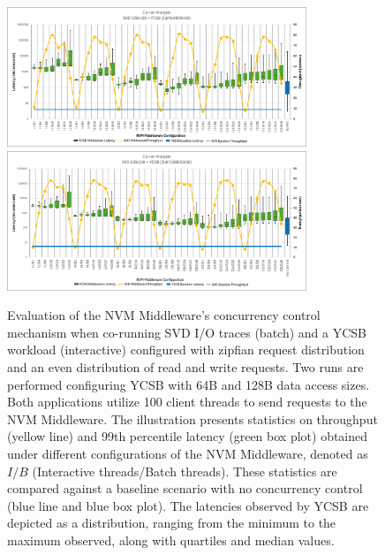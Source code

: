 \begin{figure}[ht]
  \centering
  \includegraphics[width=0.8\textwidth,height=\textheight,keepaspectratio,angle=0]{images/64b_50_50_middleware_eval.png}
  \includegraphics[width=0.8\textwidth,height=\textheight,keepaspectratio,angle=0]{images/128b_50_50_middleware_eval.png}
  \caption[Evaluation of NVM Middleware: Benchmark A]{Evaluation of the NVM Middleware's concurrency control mechanism when co-running SVD I/O traces (batch) and a YCSB workload (interactive) configured with zipfian request distribution and an even distribution of read and write requests. Two runs are performed configuring YCSB with 64B and 128B data access sizes. Both applications utilize 100 client threads to send requests to the NVM Middleware. The illustration presents statistics on throughput (yellow line) and 99th percentile latency (green box plot) obtained under different configurations of the NVM Middleware, denoted as $I/B$ (Interactive threads/Batch threads). These statistics are compared against a baseline scenario with no concurrency control (blue line and blue box plot). The latencies observed by YCSB are depicted as a distribution, ranging from the minimum to the maximum observed, along with quartiles and median values.}
  \label{fig:50_50_middleware_eval}
\end{figure}

